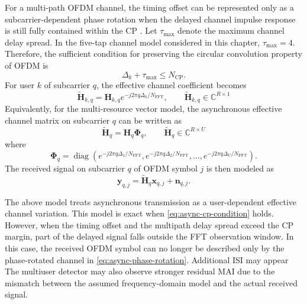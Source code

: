For a multi-path OFDM channel, the timing offset can be represented only as a subcarrier-dependent phase rotation when the delayed channel impulse response is still fully contained within the CP \cite{minn2003robust}. Let $\tau_{\max}$ denote the maximum channel delay spread. In the five-tap channel model considered in this chapter, $\tau_{\max}=4$. Therefore, the sufficient condition for preserving the circular convolution property of OFDM is
\begin{equation}
    \Delta_k+\tau_{\max}
    \leq
    N_{\mathrm{CP}} .
    \label{eq:async-cp-condition}
\end{equation}
For user $k$ of subcarrier $q$, the effective channel coefficient becomes
\begin{equation}
    \bm{\tilde{H}}_{k,q}
    =
    \bm{H}_{k,q}
    e^{-j2\pi q\Delta_k/N_{\mathrm{FFT}}},
    \qquad
    \bm{\tilde{H}}_{k,q} \in\mathbb{C}^{R\times 1}
    \label{eq:async-phase-rotation}
\end{equation}
Equivalently, for the multi-resource vector model, the asynchronous effective channel matrix on subcarrier $q$ can be written as
\begin{equation}
    \tilde{\bm{H}}_q
    =
    \bm{H}_q
    \bm{\Phi}_{q},
    \qquad
    \bm{\tilde{H}}_{q} \in\mathbb{C}^{R\times U}
    \label{eq:async-effective-channel-matrix}
\end{equation}
where
\begin{equation}
    \bm{\Phi}_{q}
    =
    \operatorname{diag}
    \left(
    e^{-j2\pi q\Delta_1/N_{\mathrm{FFT}}},
    e^{-j2\pi q\Delta_2/N_{\mathrm{FFT}}},
    \ldots,
    e^{-j2\pi q\Delta_U/N_{\mathrm{FFT}}}
    \right).
    \label{eq:async-phase-matrix}
\end{equation}
The received signal on subcarrier $q$ of OFDM symbol $j$ is then modeled as
\begin{equation}
    \bm{y}_{q,j}
    =
    \tilde{\bm{H}}_q\bm{x}_{q,j}
    +
    \bm{n}_{q,j}.
    \label{eq:async-ofdm-received}
\end{equation}

The above model treats asynchronous transmission as a user-dependent effective channel variation. This model is exact when \eqref{eq:async-cp-condition} holds. However, when the timing offset and the multipath delay spread exceed the CP margin, part of the delayed signal falls outside the FFT observation window. In this case, the received OFDM symbol can no longer be described only by the phase-rotated channel in \eqref{eq:async-phase-rotation}. Additional ISI may appear The multiuser detector may also observe stronger residual MAI due to the mismatch between the assumed frequency-domain model and the actual received signal.

